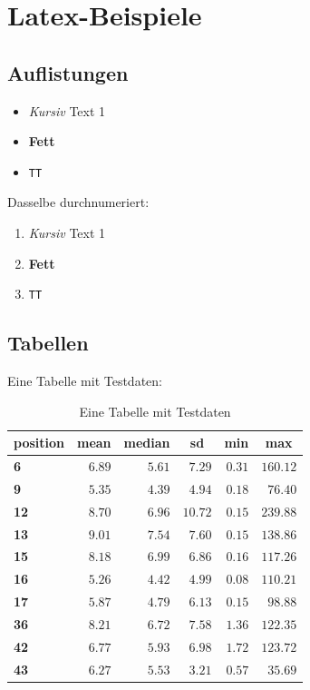 
\chapter{Latex-Beispiele}
\label{chap:bsp}

\section{Auflistungen}

\begin{itemize}
	\item \textit{Kursiv} Text 1
	\item \textbf{Fett}  
	\item \texttt{TT} 
	\end{itemize}
	
	Dasselbe durchnumeriert:
	
	\begin{enumerate}
		\item \textit{Kursiv} Text 1
		\item \textbf{Fett}  
		\item \texttt{TT} 
	\end{enumerate}


\section{Tabellen}

Eine Tabelle mit Testdaten:


\begin{table}[H]
	\begin{center}
		\begin{tabular}{lrrrrr}\hline\hline
			\multicolumn{1}{l}{\textbf{position}}&
			\multicolumn{1}{c}{\textbf{mean}}&
			\multicolumn{1}{c}{\textbf{median}}&
			\multicolumn{1}{c}{\textbf{sd}}&
			\multicolumn{1}{c}{\textbf{min}}&
			\multicolumn{1}{c}{\textbf{max}}
			\\ \hline
			\textbf{6}&$6.89$&$5.61$&$ 7.29$&$0.31$&$160.12$\\
			\textbf{9}&$5.35$&$4.39$&$ 4.94$&$0.18$&$ 76.40$\\
			\textbf{12}&$8.70$&$6.96$&$10.72$&$0.15$&$239.88$\\
			\textbf{13}&$9.01$&$7.54$&$ 7.60$&$0.15$&$138.86$\\
			\textbf{15}&$8.18$&$6.99$&$ 6.86$&$0.16$&$117.26$\\
			\textbf{16}&$5.26$&$4.42$&$ 4.99$&$0.08$&$110.21$\\
			\textbf{17}&$5.87$&$4.79$&$ 6.13$&$0.15$&$ 98.88$\\
			\textbf{36}&$8.21$&$6.72$&$ 7.58$&$1.36$&$122.35$\\
			\textbf{42}&$6.77$&$5.93$&$ 6.98$&$1.72$&$123.72$\\
			\textbf{43}&$6.27$&$5.53$&$ 3.21$&$0.57$&$ 35.69$\\
			\hline
		\end{tabular}
	\end{center}
	\caption{Eine Tabelle mit Testdaten} 
	\label{tabelle:test}
\end{table}

